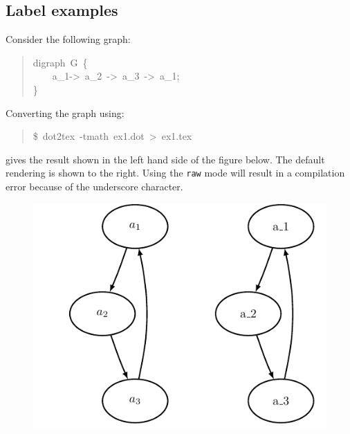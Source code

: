 \documentclass[10pt,a4paper,english]{article}
\begin{document}

\hypertarget{label-examples}{}
\subsection*{Label examples}
\label{label-examples}

Consider the following graph:
\begin{quote}{\ttfamily \raggedright \noindent
digraph~G~{\{}~\\
~~~~a{\_}1->~a{\_}2~->~a{\_}3~->~a{\_}1;~\\
{\}}
}\end{quote}

Converting the graph using:
\begin{quote}{\ttfamily \raggedright \noindent
{\$}~dot2tex~-tmath~ex1.dot~>~ex1.tex
}\end{quote}

gives the result shown in the left hand side of the figure below. The default rendering is shown to the right. Using the \texttt{raw} mode will result in a compilation error because of the underscore character.
\begin{figure}[H]
\centering

\includegraphics{pdf/ex1comb}
\end{figure}
\end{document}
